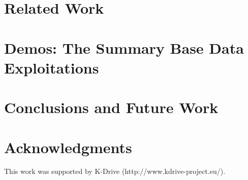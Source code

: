 \documentclass{llncs}
\begin{document}
\section{Related Work}\label{sec:RelatedWork}




\section{Demos: The Summary Base Data Exploitations }

%


\section{Conclusions and Future Work}\label{sec:Conclusions}





\section*{Acknowledgments}

This work was supported by K-Drive (http://www.kdrive-project.eu/).



%






\clearpage
{} %
\renewcommand{\indexname}{Author Index}
\printindex \clearpage
{} %
\renewcommand{\indexname}{Subject Index}
%
\end{document}
